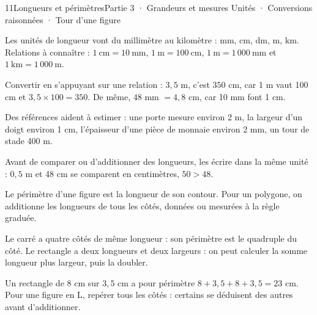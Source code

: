 \begin{ouverture}[grandeurs]{11}{Longueurs et périmètres}{Partie 3 · Grandeurs et mesures}
{Unités · Conversions raisonnées · Tour d’une figure}
\end{ouverture}
\pagestyle{otMain}\essentiel\fontsize{11}{15}\selectfont
{}\label{cours-11-1}
\begin{definition}Les unités de longueur vont du millimètre au kilomètre : mm, cm, dm, m, km. Relations à connaître : $1\ \mathrm{cm}=10\ \mathrm{mm}$, $1\ \mathrm m=100\ \mathrm{cm}$, $1\ \mathrm m=1\,000\ \mathrm{mm}$ et $1\ \mathrm{km}=1\,000\ \mathrm m$.\end{definition}
\begin{savoirfaire}Convertir en s’appuyant sur une relation : $3{,}5$ m, c’est $350$ cm, car 1 m vaut 100 cm et $3{,}5\times100=350$. De même, $48$ mm $=4{,}8$ cm, car 10 mm font 1 cm.\end{savoirfaire}
\begin{exemple}Des références aident à estimer : une porte mesure environ 2 m, la largeur d’un doigt environ 1 cm, l’épaisseur d’une pièce de monnaie environ 2 mm, un tour de stade 400 m.\end{exemple}
\begin{attention}Avant de comparer ou d’additionner des longueurs, les écrire dans la même unité : $0{,}5$ m et 48 cm se comparent en centimètres, $50>48$.\end{attention}
\clearpage
{}\label{cours-11-2}
\begin{definition}Le périmètre d’une figure est la longueur de son contour. Pour un polygone, on additionne les longueurs de tous les côtés, données ou mesurées à la règle graduée.\end{definition}
\label{fig-cours-11-2-cours-perimetre}

\begin{savoirfaire}Le carré a quatre côtés de même longueur : son périmètre est le quadruple du côté. Le rectangle a deux longueurs et deux largeurs : on peut calculer la somme longueur plus largeur, puis la doubler.\end{savoirfaire}
\begin{exemple}Un rectangle de 8 cm sur $3{,}5$ cm a pour périmètre $8+3{,}5+8+3{,}5=23$ cm. Pour une figure en L, repérer tous les côtés : certains se déduisent des autres avant d’additionner.\end{exemple}

